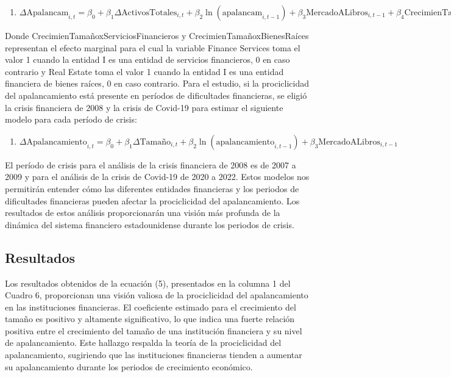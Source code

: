 \documentclass[a4paper,fleqn]{cas-sc}
\begin{document}
\begin{enumerate}[(7)]
    \item $\Delta \text{Apalancam}_{i,t} = \beta_0 + \beta_1 \Delta \text{ActivosTotales}_{i,t} + \beta_2 \ln(\text{apalancam}_{i,t-1}) + \beta_3 \text{MercadoALibros}_{i,t-1} + \beta_4 \text{CrecimienTamaño} \times \text{ServiciosFinancieros}_{i,t} + \beta_5 \text{CrecimienTamaño} \times \text{BienesRaíces}_{i,t}$
\end{enumerate}

Donde CrecimienTamañoxServiciosFinancieros y CrecimienTamañoxBienesRaíces representan el efecto marginal para el cual la variable Finance Services toma el valor 1 cuando la entidad I es una entidad de servicios financieros, 0 en caso contrario y Real Estate toma el valor 1 cuando la entidad I es una entidad financiera de bienes raíces, 0 en caso contrario.
Para el estudio, si la prociclicidad del apalancamiento está presente en períodos de dificultades financieras, se eligió la crisis financiera de 2008 y la crisis de Covid-19 para estimar el siguiente modelo para cada período de crisis:

\begin{enumerate}[(8)]
    \item $\Delta \text{Apalancamiento}_{i,t} = \beta_0 + \beta_1 \Delta \text{Tamaño}_{i,t} + \beta_2 \ln(\text{apalancamiento}_{i,t-1}) + \beta_3 \text{MercadoALibros}_{i,t-1}$
\end{enumerate}

El período de crisis para el análisis de la crisis financiera de 2008 es de 2007 a 2009 y para el análisis de la crisis de Covid-19 de 2020 a 2022. Estos modelos nos permitirán entender cómo las diferentes entidades financieras y los periodos de dificultades financieras pueden afectar la prociclicidad del apalancamiento. Los resultados de estos análisis proporcionarán una visión más profunda de la dinámica del sistema financiero estadounidense durante los periodos de crisis.


\subsection{Resultados}
Los resultados obtenidos de la ecuación (5), presentados en la columna 1 del Cuadro 6, proporcionan una visión valiosa de la prociclicidad del apalancamiento en las instituciones financieras. El coeficiente estimado para el crecimiento del tamaño es positivo y altamente significativo, lo que indica una fuerte relación positiva entre el crecimiento del tamaño de una institución financiera y su nivel de apalancamiento. Este hallazgo respalda la teoría de la prociclicidad del apalancamiento, sugiriendo que las instituciones financieras tienden a aumentar su apalancamiento durante los periodos de crecimiento económico.
\end{document}
